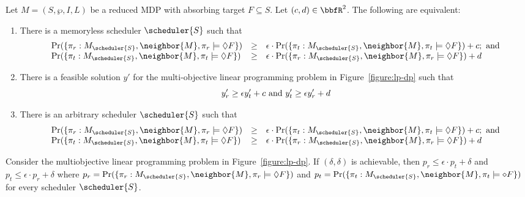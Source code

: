 {\begin{theorem}\cite{EKVY:07:MMCMDP}
  Let $M = (S, \wp, I, L)$ be a reduced MDP with absorbing target $F
  \subseteq S$. Let $(c, d) \in \bbfR^2$. The following are
  equivalent:
  \begin{enumerate}
  \item There is a memoryless scheduler $\scheduler{S}$ such that
    \[
    \begin{array}{lcl}
      \Pr(\{ \pi_r : M_{\scheduler{S}}, \neighbor{M}, \pi_r \models
      \Diamond F \}) & \geq &
      \epsilon \cdot 
      \Pr(\{ \pi_t : M_{\scheduler{S}}, \neighbor{M}, \pi_t \models
      \Diamond F \}) + c; \textmd{ and}\\
      \Pr(\{ \pi_t : M_{\scheduler{S}}, \neighbor{M}, \pi_t \models
      \Diamond F \}) & \geq &
      \epsilon \cdot 
      \Pr(\{ \pi_r : M_{\scheduler{S}}, \neighbor{M}, \pi_r \models
      \Diamond F \}) + d
    \end{array}
    \]
  \item There is a feasible solution $y'$ for the multi-objective
    linear programming problem in Figure~\ref{figure:lp-dp} such that
    \[
    y'_r \geq \epsilon y'_t + c \textmd{ and }
    y'_t \geq \epsilon y'_r + d
    \]
  \item There is an arbitrary scheduler $\scheduler{S}$ such that
    \[
    \begin{array}{lcl}
      \Pr(\{ \pi_r : M_{\scheduler{S}}, \neighbor{M}, \pi_r \models
      \Diamond F \}) & \geq &
      \epsilon \cdot 
      \Pr(\{ \pi_t : M_{\scheduler{S}}, \neighbor{M}, \pi_t \models
      \Diamond F \}) + c; \textmd{ and}\\
      \Pr(\{ \pi_t : M_{\scheduler{S}}, \neighbor{M}, \pi_t \models
      \Diamond F \}) & \geq &
      \epsilon \cdot 
      \Pr(\{ \pi_r : M_{\scheduler{S}}, \neighbor{M}, \pi_r \models
      \Diamond F \}) + d
    \end{array}
    \]
  \end{enumerate}
\end{theorem}

\begin{lemma}
  Consider the multiobjective linear programming problem in
  Figure~\ref{figure:lp-dp}. If $(\delta, \delta)$ is achievable, then
  $p_r \leq \epsilon \cdot p_t + \delta$ and $p_t \leq \epsilon \cdot
  p_r + \delta$ where $p_r = \Pr (\{ \pi_r : M_{\scheduler{S}},
  \neighbor{M}, \pi_r \models \Diamond F \})$ and $p_t = \Pr (\{ \pi_t
  : M_{\scheduler{S}}, \neighbor{M}, \pi_t \models \diamond F \})$ for
  every scheduler $\scheduler{S}$.
\end{lemma}

}

